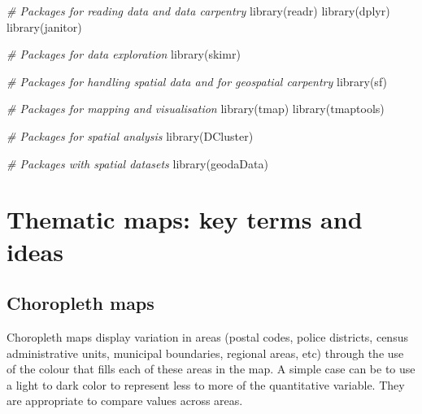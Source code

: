 \documentclass[
]{book}
\newenvironment{Shaded}{\begin{snugshade}}{\end{snugshade}}
\newcommand{\CommentTok}[1]{\textcolor[rgb]{0.56,0.35,0.01}{\textit{#1}}}
\newcommand{\FunctionTok}[1]{\textcolor[rgb]{0.00,0.00,0.00}{#1}}
\newcommand{\NormalTok}[1]{#1}
\begin{document}
\begin{Shaded}
\begin{Highlighting}[]
\CommentTok{\# Packages for reading data and data carpentry}
\FunctionTok{library}\NormalTok{(readr)}
\FunctionTok{library}\NormalTok{(dplyr)}
\FunctionTok{library}\NormalTok{(janitor)}

\CommentTok{\# Packages for data exploration}
\FunctionTok{library}\NormalTok{(skimr)}

\CommentTok{\# Packages for handling spatial data and for geospatial carpentry}
\FunctionTok{library}\NormalTok{(sf)}

\CommentTok{\# Packages for mapping and visualisation}
\FunctionTok{library}\NormalTok{(tmap)}
\FunctionTok{library}\NormalTok{(tmaptools)}

\CommentTok{\# Packages for spatial analysis}
\FunctionTok{library}\NormalTok{(DCluster)}

\CommentTok{\# Packages with spatial datasets}
\FunctionTok{library}\NormalTok{(geodaData)}
\end{Highlighting}
\end{Shaded}

\hypertarget{thematic-maps-key-terms-and-ideas}{%
\section{Thematic maps: key terms and ideas}\label{thematic-maps-key-terms-and-ideas}}

\hypertarget{choropleth-maps}{%
\subsection{Choropleth maps}\label{choropleth-maps}}

Choropleth maps display variation in areas (postal codes, police districts, census administrative units, municipal boundaries, regional areas, etc) through the use of the colour that fills each of these areas in the map. A simple case can be to use a light to dark color to represent less to more of the quantitative variable. They are appropriate to compare values across areas.
\end{document}
